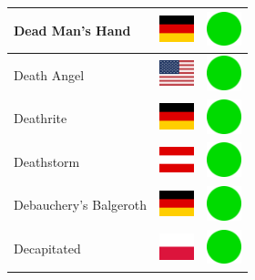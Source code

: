\documentclass[12pt, a4paper, twoside]{report}
\begin{document}
\begin{center}
\begin{longtable}{|p{5cm}|p{2cm}|p{2cm}|}
 Dead Man's Hand                                            & \includegraphics[width=1cm]{4x3/de} &   \includegraphics[width=1cm]{likes/y} \\ \hline
 Death Angel                                                & \includegraphics[width=1cm]{4x3/us} &   \includegraphics[width=1cm]{likes/y} \\ \hline
 Deathrite                                                  & \includegraphics[width=1cm]{4x3/de} &   \includegraphics[width=1cm]{likes/y} \\ \hline
 Deathstorm                                                 & \includegraphics[width=1cm]{4x3/at} &   \includegraphics[width=1cm]{likes/y} \\ \hline
 Debauchery's Balgeroth                                     & \includegraphics[width=1cm]{4x3/de} &   \includegraphics[width=1cm]{likes/y} \\ \hline
 Decapitated                                                & \includegraphics[width=1cm]{4x3/pl} &   \includegraphics[width=1cm]{likes/y} \\ \hline

\end{longtable}
\end{center}
\end{document}
